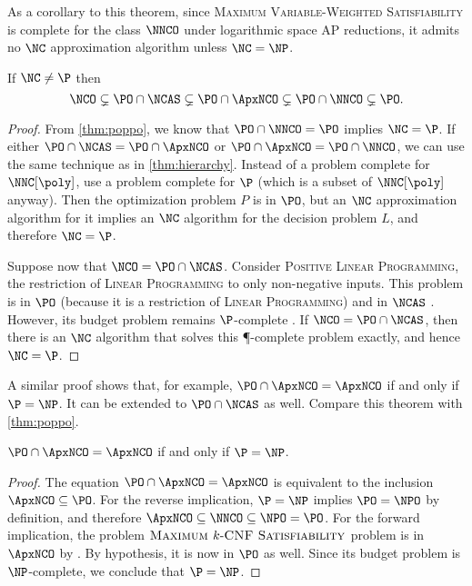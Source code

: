 As a corollary to this theorem, since \textsc{Maximum Variable-Weighted Satisfiability} is complete for the class $\NNCO$ under logarithmic space AP reductions, it admits no $\NC$ approximation algorithm unless $\NC = \NP$.

\begin{theorem}\label{thm:hierarchy2}
  If $\NC \neq \P$ then
  \begin{equation*}
    \NCO \subsetneq \PO \cap \NCAS \subsetneq \PO \cap \ApxNCO \subsetneq \PO \cap \NNCO \subsetneq \PO.
  \end{equation*}
\end{theorem}
\begin{proof}
  From \autoref{thm:poppo}, we know that $\PO \cap \NNCO = \PO$ implies $\NC = \P$.
  If either $\PO \cap \NCAS = \PO \cap \ApxNCO$ or $\PO \cap \ApxNCO = \PO \cap \NNCO$, we can use the same technique as in \autoref{thm:hierarchy}.
  Instead of a problem complete for $\NNC[\poly]$, use a problem complete for $\P$ (which is a subset of $\NNC[\poly]$ anyway).
  Then the optimization problem $P$ is in $\PO$, but an $\NC$ approximation algorithm for it implies an $\NC$ algorithm for the decision problem $L$, and therefore $\NC = \P$.

  Suppose now that $\NCO = \PO \cap \NCAS$.
  Consider \textsc{Positive Linear Programming}, the restriction of \textsc{Linear Programming} to only non-negative inputs.
  This problem is in $\PO$ (because it is a restriction of \textsc{Linear Programming}) and in $\NCAS$ \cite{ln93}.
  However, its budget problem remains $\P$-complete \cite{tx98}.
  If $\NCO = \PO \cap \NCAS$, then there is an $\NC$ algorithm that solves this \P-complete problem exactly, and hence $\NC = \P$.
\end{proof}

A similar proof shows that, for example, $\PO \cap \ApxNCO = \ApxNCO$ if and only if $\P = \NP$.
It can be extended to $\PO \cap \NCAS$ as well.
Compare this theorem with \autoref{thm:poppo}.

\begin{theorem}
  $\PO \cap \ApxNCO = \ApxNCO$ if and only if $\P = \NP$.
\end{theorem}
\begin{proof}
  The equation $\PO \cap \ApxNCO = \ApxNCO$ is equivalent to the inclusion $\ApxNCO \subseteq \PO$.
  For the reverse implication, $\P = \NP$ implies $\PO = \NPO$ by definition, and therefore $\ApxNCO \subseteq \NNCO \subseteq \NPO = \PO$.
  For the forward implication, the problem $\textsc{Maximum } k\textnormal{-}\textsc{CNF Satisfiability}$ problem is in $\ApxNCO$ by \cite[Theorem~8.6]{acgkmp99}.
  By hypothesis, it is now in $\PO$ as well.
  Since its budget problem is $\NP$-complete, we conclude that $\P = \NP$.
\end{proof}

